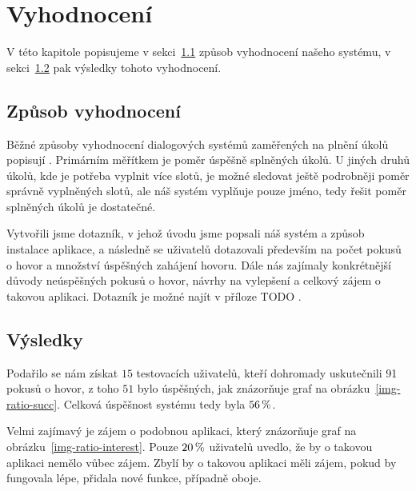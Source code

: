 \chapter{Vyhodnocení}

V této kapitole popisujeme v sekci~\ref{methods} způsob vyhodnocení našeho systému,
v sekci~\ref{results} pak výsledky tohoto vyhodnocení.

\section{Způsob vyhodnocení}\label{methods}

Běžné způsoby vyhodnocení dialogových systémů zaměřených na plnění úkolů popisují
\citet[podsekce 24.5.2]{jurafsky_slp_2020}. Primárním měřítkem je poměr úspěšně
splněných úkolů. U jiných druhů úkolů, kde je potřeba vyplnit více slotů, je možné
sledovat ještě podrobněji poměr správně vyplněných slotů, ale náš systém
vyplňuje pouze jméno, tedy řešit poměr splněných úkolů je dostatečné.

Vytvořili jsme dotazník, v jehož úvodu jsme popsali náš systém a způsob instalace
aplikace, a následně se uživatelů dotazovali především na počet pokusů o hovor a
množství úspěšných zahájení hovoru. Dále nás zajímaly konkrétnější důvody neúspěšných
pokusů o hovor, návrhy na vylepšení a celkový zájem o takovou aplikaci. Dotazník je
možné najít v příloze TODO .

\section{Výsledky}\label{results}

Podařilo se nám získat \(15\) testovacích uživatelů, kteří dohromady uskutečnili 91
pokusů o hovor, z toho \(51\) bylo úspěšných, jak znázorňuje
graf na obrázku~\ref{img-ratio-succ}. Celková úspěšnost
systému tedy byla \(56\,\rm \%\).

Velmi zajímavý je zájem o podobnou aplikaci, který znázorňuje graf na obrázku~\ref{img-ratio-interest}.
Pouze \(20\,\rm \%\) uživatelů uvedlo, že by o takovou aplikaci nemělo vůbec zájem.
Zbylí by o takovou aplikaci měli zájem, pokud by fungovala lépe, přidala nové funkce,
případně oboje.


